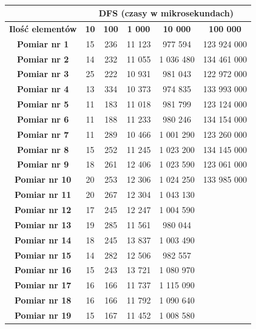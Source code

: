 \documentclass[11pt,a4paper]{article}
\begin{document}
\begin{table}[htbp]
\caption{}
\begin{center}
\begin{tabular}{|c|c|c|c|c|c|}
\hline
\textbf{} & \multicolumn{ 5}{c|}{\textbf{DFS (czasy w mikrosekundach)}} \\ \hline
\textbf{Ilość elementów} & \textbf{10} & \textbf{100} & \textbf{1 000} & \textbf{10 000} & \textbf{100 000} \\ \hline
\textbf{Pomiar nr 1} & 15 & 236 & 11 123 & 977 594 & 123 924 000 \\ \hline
\textbf{Pomiar nr 2} & 14 & 232 & 11 055 & 1 036 480 & 134 461 000 \\ \hline
\textbf{Pomiar nr 3} & 25 & 222 & 10 931 & 981 043 & 122 972 000 \\ \hline
\textbf{Pomiar nr 4} & 13 & 334 & 10 373 & 974 835 & 133 993 000 \\ \hline
\textbf{Pomiar nr 5} & 11 & 183 & 11 018 & 981 799 & 123 124 000 \\ \hline
\textbf{Pomiar nr 6} & 11 & 188 & 11 233 & 980 246 & 134 154 000 \\ \hline
\textbf{Pomiar nr 7} & 11 & 289 & 10 466 & 1 001 290 & 123 260 000 \\ \hline
\textbf{Pomiar nr 8} & 15 & 252 & 11 245 & 1 023 200 & 134 145 000 \\ \hline
\textbf{Pomiar nr 9} & 18 & 261 & 12 406 & 1 023 590 & 123 061 000 \\ \hline
\textbf{Pomiar nr 10} & 20 & 253 & 12 306 & 1 024 250 & 133 985 000 \\ \hline
\textbf{Pomiar nr 11} & 20 & 267 & 12 304 & 1 043 130 &  \\ \hline
\textbf{Pomiar nr 12} & 17 & 245 & 12 247 & 1 004 590 &  \\ \hline
\textbf{Pomiar nr 13} & 19 & 285 & 11 561 & 980 044 &  \\ \hline
\textbf{Pomiar nr 14} & 18 & 245 & 13 837 & 1 003 490 &  \\ \hline
\textbf{Pomiar nr 15} & 14 & 282 & 12 506 & 982 557 &  \\ \hline
\textbf{Pomiar nr 16} & 15 & 243 & 13 721 & 1 080 970 &  \\ \hline
\textbf{Pomiar nr 17} & 16 & 166 & 11 737 & 1 115 090 &  \\ \hline
\textbf{Pomiar nr 18} & 16 & 166 & 11 792 & 1 090 640 &  \\ \hline
\textbf{Pomiar nr 19} & 15 & 167 & 11 452 & 1 008 580 &  \\ \hline

\end{tabular}
\end{center}
\end{table}
\end{document}
